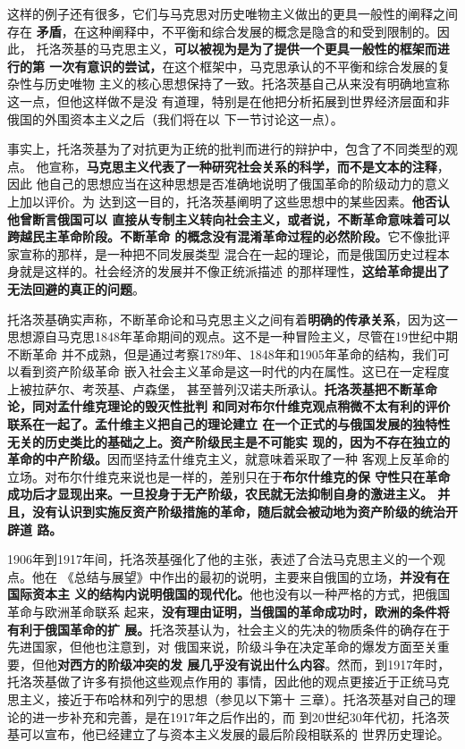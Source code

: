 这样的例子还有很多，它们与马克思对历史唯物主义做出的更具一般性的阐释之间存在
\textbf{矛盾}，在这种阐释中，不平衡和综合发展的概念是隐含的和受到限制的。因此，
托洛茨基的马克思主义，\textbf{可以被视为是为了提供一个更具一般性的框架而进行的第
一次有意识的尝试，}在这个框架中，马克思承认的不平衡和综合发展的复杂性与历史唯物
主义的核心思想保持了一致。托洛茨基自己从来没有明确地宣称这一点，但他这样做不是没
有道理，特别是在他把分析拓展到世界经济层面和非俄国的外围资本主义之后（我们将在以
下一节讨论这一点）。

事实上，托洛茨基为了对抗更为正统的批判而进行的辩护中，包含了不同类型的观点。
他宣称，\textbf{马克思主义代表了一种研究社会关系的科学，而不是文本的注释}，因此
他自己的思想应当在这种思想是否准确地说明了俄国革命的阶级动力的意义上加以评价。为
达到这一目的，托洛茨基阐明了这些思想中的某些因素。\textbf{他否认他曾断言俄国可以
直接从专制主义转向社会主义，或者说，不断革命意味着可以跨越民主革命阶段。不断革命
的概念没有混淆革命过程的必然阶段。}它不像批评家宣称的那样，是一种把不同发展类型
混合在一起的理论，而是俄国历史过程本身就是这样的。社会经济的发展并不像正统派描述
的那样理性，\textbf{这给革命提出了无法回避的真正的问题}。

托洛茨基确实声称，不断革命论和马克思主义之间有着\textbf{明确的传承关系}，因为这一
思想源自马克思1848年革命期间的观点。这不是一种冒险主义，尽管在19世纪中期不断革命
并不成熟，但是通过考察1789年、1848年和1905年革命的结构，我们可以看到资产阶级革命
嵌入社会主义革命是这一时代的内在属性。这已在一定程度上被拉萨尔、考茨基、卢森堡，
甚至普列汉诺夫所承认。\textbf{托洛茨基把不断革命论，同对孟什维克理论的毁灭性批判
  和同对布尔什维克观点稍微不太有利的评价联系在一起了。孟什维主义把自己的理论建立
  在一个正式的与俄国发展的独特性无关的历史类比的基础之上。资产阶级民主是不可能实
  现的，因为不存在独立的革命的中产阶级。}因而坚持孟什维克主义，就意味着采取了一种
客观上反革命的立场。对布尔什维克来说也是一样的，差别只在于\textbf{布尔什维克的保
  守性只在革命成功后才显现出来。一旦投身于无产阶级，农民就无法抑制自身的激进主义。
  并且，没有认识到实施反资产阶级措施的革命，随后就会被动地为资产阶级的统治开辟道
  路。}

1906年到1917年间，托洛茨基强化了他的主张，表述了合法马克思主义的一个观点。他在
《总结与展望》中作出的最初的说明，主要来自俄国的立场，\textbf{并没有在国际资本主
  义的结构内说明俄国的现代化。}他也没有以一种严格的方式，把俄国革命与欧洲革命联系
起来，\textbf{没有理由证明，当俄国的革命成功时，欧洲的条件将有利于俄国革命的扩
  展。}托洛茨基认为，社会主义的先决的物质条件的确存在于先进国家，但他也注意到，对
俄国来说，阶级斗争在决定革命的爆发方面至关重要，但他\textbf{对西方的阶级冲突的发
  展几乎没有说出什么内容}。然而，到1917年时，托洛茨基做了许多有损他这些观点作用的
事情，因此他的观点更接近于正统马克思主义，接近于布哈林和列宁的思想（参见以下第十
三章）。托洛茨基对自己的理论的进一步补充和完善，是在1917年之后作出的，而
到20世纪30年代初，托洛茨基可以宣布，他已经建立了与资本主义发展的最后阶段相联系的
世界历史理论。

